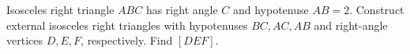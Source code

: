 Isosceles right triangle $ABC$ has right angle $C$ and hypotenuse $AB=2$. Construct external isosceles right triangles with hypotenuses $BC,AC,AB$ and right-angle vertices $D,E,F$, respectively. Find $[DEF]$.
